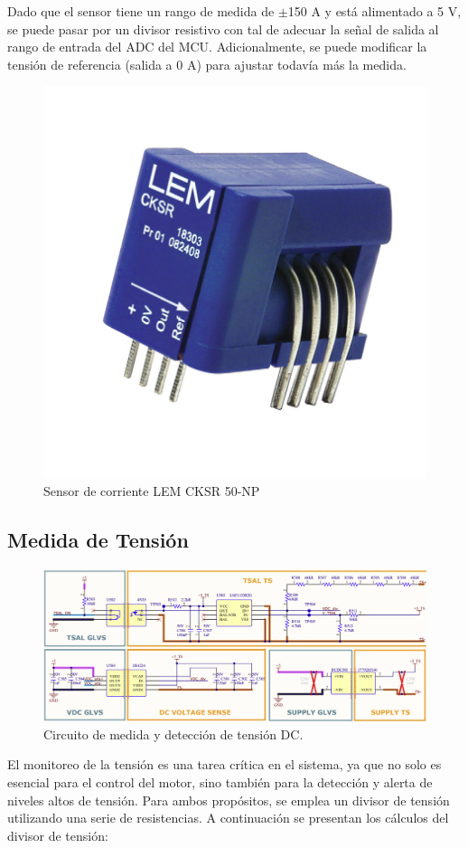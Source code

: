 Dado que el sensor tiene un rango de medida de $\pm$150 A y está alimentado a 5 V, se puede pasar por un divisor resistivo con tal de adecuar la señal de salida al rango de entrada del ADC del MCU. Adicionalmente, se puede modificar la tensión de referencia (salida a 0 A) para ajustar todavía más la medida.

\begin{figure}[H]
	\centering
	\includegraphics[width=0.5\linewidth]{fig/cksr50}
	\caption{Sensor de corriente LEM CKSR 50-NP}
\end{figure}


\subsection{Medida de Tensión}

\begin{figure}[H]
	\centering
	\includegraphics[width=0.8\linewidth]{fig/Vmeas-sch}
	\caption{Circuito de medida y detección de tensión DC.}
\end{figure}

El monitoreo de la tensión es una tarea crítica en el sistema, ya que no solo es esencial para el control del motor, sino también para la detección y alerta de niveles altos de tensión. Para ambos propósitos, se emplea un divisor de tensión utilizando una serie de resistencias. A continuación se presentan los cálculos del divisor de tensión:

